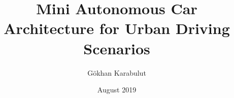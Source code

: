 \documentclass[chaparabic,ceng,ms,12pt,oneandhalf]{metu}
\author{Gökhan Karabulut}
\title{Mini Autonomous Car Architecture for Urban Driving Scenarios}
\date{August 2019}
\begin{document}
\begin{preliminaries}


\end{preliminaries}
%
%
%

\setlength{\parindent}{0em}
\setlength{\parskip}{10pt}












%
%

% 

% 
\end{document}
